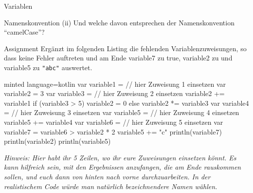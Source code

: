\begin{task}[points=auto]{Variablen }
\begin{subtask*}[points=0]{Namenskonvention}
        (ii) Und welche davon entsprechen der Namenskonvention \enquote{camelCase}?
    \end{subtask*}
    \begin{subtask*}[points=0]{Assignment}
        Ergänzt im folgenden Listing die fehlenden Variablenzuweisungen, so dass keine Fehler auftreten und am Ende {\ttfamily variable7} zu {\ttfamily true}, {\ttfamily variable2} zu {} und {\ttfamily variable5} zu {\ttfamily \verb+"abc"+} auswertet.
        \begin{codeBlock}[]{minted language=kotlin}
            var variable1 = // hier Zuweisung 1 einsetzen
            var variable2 = 3
            var variable3 = // hier Zuweisung 2 einsetzen
            variable2 += variable1
            if (variable3 > 5) {
                    variable2 = 0
                } else {
                    variable2 *= variable3
                }
            var variable4 = // hier Zuweisung 3 einsetzen
            var variable5 = // hier Zuweisung 4 einsetzen
            variable5 += variable4
            var variable6 = // hier Zuweisung 5 einsetzen
            var variable7 = variable6 > variable2 * 2
            variable5 += "c"
            println(variable7)
            println(variable2)
            println(variable5)
        \end{codeBlock}

        \textit{Hinweis: Hier habt ihr 5 Zeilen, wo ihr eure Zuweisungen einsetzen könnt. Es kann hilfreich sein, mit den Ergebnissen anzufangen, die am Ende rauskommen sollen, und euch dann von hinten nach vorne durchzuarbeiten. In der realistischem Code würde man natürlich bezeichnendere Namen wählen.}


\end{subtask*}
\end{task}
